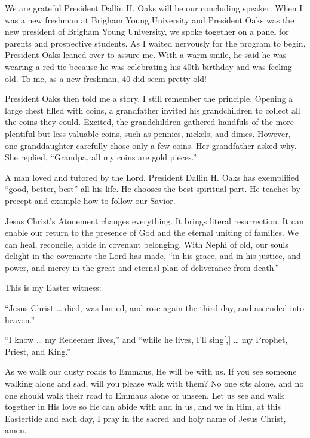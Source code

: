 \documentclass[letterpaper, 11pt]{report}
\newcommand{\speaker}{}
\newcommand{\talk}{}
\newcommand{\talkdatestr}{}
\newcommand{\setspeaker}[1]{\renewcommand{\speaker}{#1}}
\newcommand{\settalk}[1]{\renewcommand{\talk}{#1}}
\newcommand{\talkheading}[2]{%
    \vspace{1em}
    \noindent{\huge\bfseries #1}
    \par\nopagebreak\vspace{0.25em}
    \noindent{\normalsize\bfseries #2\ifx\talkdatestr\empty\else,\ \talkdatestr\fi}
    \par\nopagebreak\vspace{0.5em}
}
\begin{document}
We are grateful President Dallin H. Oaks will be our concluding speaker. When I was a new freshman at Brigham Young University and President Oaks was the new president of Brigham Young University, we spoke together on a panel for parents and prospective students. As I waited nervously for the program to begin, President Oaks leaned over to assure me. With a warm smile, he said he was wearing a red tie because he was celebrating his 40th birthday and was feeling old. To me, as a new freshman, 40 did seem pretty old!

President Oaks then told me a story. I still remember the principle. Opening a large chest filled with coins, a grandfather invited his grandchildren to collect all the coins they could. Excited, the grandchildren gathered handfuls of the more plentiful but less valuable coins, such as pennies, nickels, and dimes. However, one granddaughter carefully chose only a few coins. Her grandfather asked why. She replied, “Grandpa, all my coins are gold pieces.”

A man loved and tutored by the Lord, President Dallin H. Oaks has exemplified “good, better, best” all his life. He chooses the best spiritual part. He teaches by precept and example how to follow our Savior.

Jesus Christ’s Atonement changes everything. It brings literal resurrection. It can enable our return to the presence of God and the eternal uniting of families. We can heal, reconcile, abide in covenant belonging. With Nephi of old, our souls delight in the covenants the Lord has made, “in his grace, and in his justice, and power, and mercy in the great and eternal plan of deliverance from death.”

This is my Easter witness:

“Jesus Christ … died, was buried, and rose again the third day, and ascended into heaven.”

“I know … my Redeemer lives,” and “while he lives, I’ll sing[,] … my Prophet, Priest, and King.”

As we walk our dusty roads to Emmaus, He will be with us. If you see someone walking alone and sad, will you please walk with them? No one sits alone, and no one should walk their road to Emmaus alone or unseen. Let us see and walk together in His love so He can abide with and in us, and we in Him, at this Eastertide and each day, I pray in the sacred and holy name of Jesus Christ, amen.

\newpage
\settalk{Closing Remarks}
\setspeaker{Dallin H. Oaks}
\talkheading{Closing Remarks}{Dallin H. Oaks}
\end{document}
